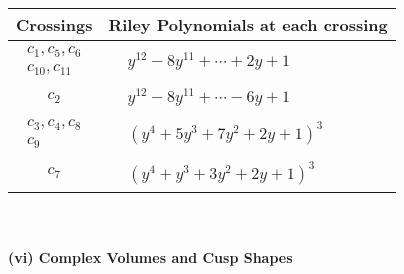 \documentclass[1p]{elsarticle_modified}
\theoremstyle{definition}
\begin{document}
\begin{tabular}{m{50pt}|m{274pt}}
Crossings & \hspace{64pt}Riley Polynomials at each crossing \\
\hline $$\begin{aligned}c_{1},c_{5},c_{6}\\c_{10},c_{11}\end{aligned}$$&$\begin{aligned}
&y^{12}-8 y^{11}+\cdots+2 y+1
\end{aligned}$\\
\hline $$\begin{aligned}c_{2}\end{aligned}$$&$\begin{aligned}
&y^{12}-8 y^{11}+\cdots-6 y+1
\end{aligned}$\\
\hline $$\begin{aligned}c_{3},c_{4},c_{8}\\c_{9}\end{aligned}$$&$\begin{aligned}
&(y^4+5 y^3+7 y^2+2 y+1)^3
\end{aligned}$\\
\hline $$\begin{aligned}c_{7}\end{aligned}$$&$\begin{aligned}
&(y^4+y^3+3 y^2+2 y+1)^3
\end{aligned}$\\
\hline
\end{tabular}\\~\\
\newpage\flushleft \textbf{(vi) Complex Volumes and Cusp Shapes}
\end{document}
